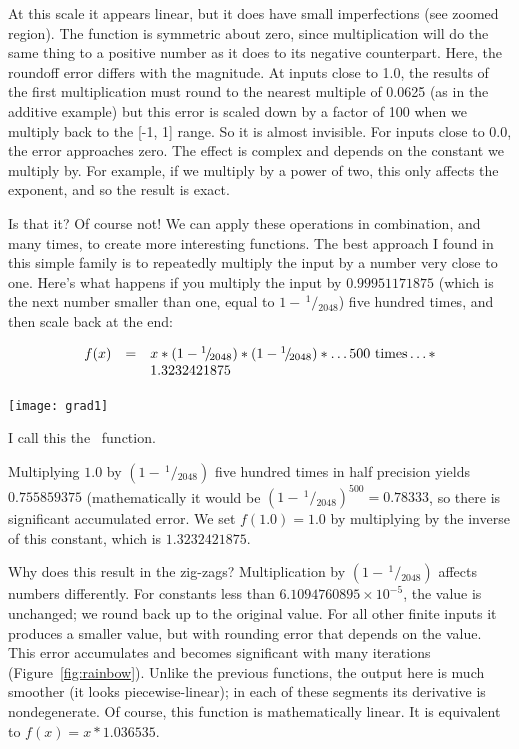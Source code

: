 \documentclass[twocolumn]{article}
\newcommand\sfrac[2]{\!{}\,^{#1}\!/{}\!_{#2}}
\begin{document}
At this scale it appears linear, but it does have small imperfections
(see zoomed region). The function is symmetric about zero, since
multiplication will do the same thing to a positive number as it does
to its negative counterpart. Here, the roundoff error differs with the
magnitude. At inputs close to 1.0, the results of the first
multiplication must round to the nearest multiple of 0.0625 (as in the
additive example) but this error is scaled down by a factor of 100
when we multiply back to the [-1, 1] range. So it is almost invisible.
For inputs close to 0.0, the error approaches zero. The effect is complex
and depends on the constant we multiply by. For example, if we multiply
by a power of two, this only affects the exponent, and so the result is
exact.

\medskip
Is that it? Of course not! We can apply these operations in
combination, and many times, to create more interesting functions. The
best approach I found in this simple family is to repeatedly multiply
the input by a number very close to one. Here's what happens if you
multiply the input by $0.99951171875$ (which is the next number
smaller than one, equal to $1 - \sfrac{1}{2048}$) five hundred times,
and then scale back at the end:

\[
\begin{array}{rcl}
  f(x) & = & x * (1 - \sfrac{1}{2048}) * (1 - \sfrac{1}{2048}) * \ldots \textrm{500 times} \ldots * \\
  \, & \, & 1.3232421875$$
\end{array}
\]

\begin{center}
\texttt{[image: grad1]}
\end{center}

I call this the \gradone\ function.

Multiplying $1.0$ by $(1 - \sfrac{1}{2048})$ five hundred times in
half precision yields $0.755859375$ (mathematically it would be $(1 -
\sfrac{1}{2048})^{500} = 0.78333$, so there is significant accumulated
error. We set $f(1.0) = 1.0$ by multiplying by the inverse of this
constant, which is $1.3232421875$.

Why does this result in the zig-zags? Multiplication by $(1 -
\sfrac{1}{2048})$ affects numbers differently. For constants less than
$6.1094760895 \times 10^{-5}$, the value is unchanged; we round back up to
the original value. For all other finite inputs it produces a smaller
value, but with rounding error that depends on the value. This error
accumulates and becomes significant with many iterations
(Figure~\ref{fig:rainbow}). Unlike the previous functions, the output
here is much smoother (it looks piecewise-linear); in each of these
segments its derivative is nondegenerate. Of course, this function is
mathematically linear. It is equivalent to $f(x) = x * 1.036535$.
\end{document}
